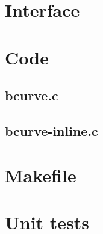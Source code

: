 \section{Interface}

\begin{scriptsize}
\begin{ttfamily}

\end{ttfamily}
\end{scriptsize}

\section{Code}

\subsection{bcurve.c}

\begin{scriptsize}
\begin{ttfamily}

\end{ttfamily}
\end{scriptsize}

\subsection{bcurve-inline.c}

\begin{scriptsize}
\begin{ttfamily}

\end{ttfamily}
\end{scriptsize}

\section{Makefile}

\begin{scriptsize}
\begin{ttfamily}

\end{ttfamily}
\end{scriptsize}

\section{Unit tests}

